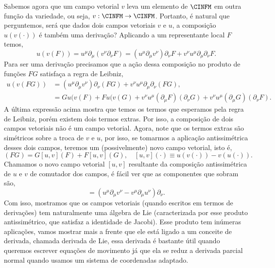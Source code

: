 Sabemos agora que um campo vetorial $v$ leva um elemento de $\CINFM$ em outra
função da variedade, ou seja, $v:\CINFM\to\CINFM$. Portanto, é natural que
perguntemos, será que dados dois campos vetoriais $v$ e $u$, a composição
$u(v(\cdot))$ é também uma derivação? Aplicando a um representante local $F$ temos,
\begin{equation}
	u(v(F)) = u^\mu\partial_\mu \left(v^\nu\partial_\nu F\right) =  \left(u^\mu\partial_\mu v^\nu\right)\partial_\nu F +  v^\nu u^\mu\partial_\mu\partial_\nu F.
\end{equation}
Para ser uma derivação precisamos que a ação dessa composição no produto de funções $FG$ satisfaça a regra de Leibniz,
\begin{align}
	u(v(FG)) & = \left(u^\mu\partial_\mu v^\nu\right)\partial_\nu (FG) +  v^\nu u^\mu\partial_\mu\partial_\nu (FG),              \\
	         & = Gu(v(F)+Fu(v(G) + v^\nu u^\mu(\partial_\mu F) (\partial_\nu G) +  v^\nu u^\mu(\partial_\mu G) (\partial_\nu F).
\end{align}
A última expressão acima mostra que temos os termos que esperamos pela regra de
Leibniz, porém existem dois termos extras. Por isso, a composição de dois campos
vetoriais não é um campo vetorial. Agora, note que os termos extras são
simétricos sobre a troca de $v$ e $u$, por isso, se tomarmos a aplicação
antissimétrica desses dois campos, teremos um (possivelmente) novo campo
vetorial, isto é,
\begin{equation}
	[u,v](FG) = G[u,v](F) + F[u,v](G), \quad [u,v](\cdot) \equiv u(v(\cdot)) - v(u(\cdot)).
\end{equation}
Chamamos o novo campo vetorial $[u,v]$ resultante da composição antissimétrica
de $u$ e $v$ de comutador dos campos, é fácil ver que as componentes que sobram são,
\begin{equation}
	[u,v] = \left(u^\mu\partial_\mu v^\nu - v^\mu\partial_\mu u^\nu\right) \partial_\nu.
\end{equation}
Com isso, mostramos que os campos vetoriais (quando escritos em termos de
derivações) tem naturalmente uma álgebra de Lie (caracterizada por esse produto
antissimétrico, que satisfaz a identidade de Jacobi). Esse produto tem inúmeras aplicações, vamos mostrar mais a frente que ele está ligado a um conceite de derivada, chamada derivada de Lie, essa derivada é bastante útil quando queremos escrever equações de movimento já que ela se reduz a derivada parcial normal quando usamos um sistema de coordenadas adaptado.


